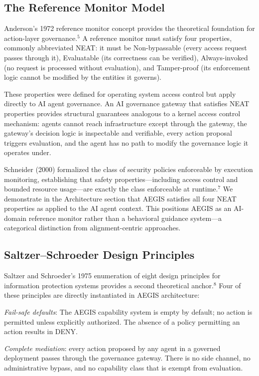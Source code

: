 \documentclass{IEEEcsmag}
\begin{document}
\subsection{The Reference Monitor Model}

Anderson's 1972 reference monitor concept provides the theoretical foundation for action-layer governance.$^{5}$ A reference monitor must satisfy four properties, commonly abbreviated NEAT: it must be Non-bypassable (every access request passes through it), Evaluatable (its correctness can be verified), Always-invoked (no request is processed without evaluation), and Tamper-proof (its enforcement logic cannot be modified by the entities it governs).

These properties were defined for operating system access control but apply directly to AI agent governance. An AI governance gateway that satisfies NEAT properties provides structural guarantees analogous to a kernel access control mechanism: agents cannot reach infrastructure except through the gateway, the gateway's decision logic is inspectable and verifiable, every action proposal triggers evaluation, and the agent has no path to modify the governance logic it operates under.

Schneider (2000) formalized the class of security policies enforceable by execution monitoring, establishing that safety properties---including access control and bounded resource usage---are exactly the class enforceable at runtime.$^{7}$ We demonstrate in the Architecture section that AEGIS satisfies all four NEAT properties as applied to the AI agent context. This positions AEGIS as an AI-domain reference monitor rather than a behavioral guidance system---a categorical distinction from alignment-centric approaches.

\subsection{Saltzer--Schroeder Design Principles}

Saltzer and Schroeder's 1975 enumeration of eight design principles for information protection systems provides a second theoretical anchor.$^{8}$ Four of these principles are directly instantiated in AEGIS architecture:

{\it Fail-safe defaults}: The AEGIS capability system is empty by default; no action is permitted unless explicitly authorized. The absence of a policy permitting an action results in DENY.

{\it Complete mediation}: every action proposed by any agent in a governed deployment passes through the governance gateway. There is no side channel, no administrative bypass, and no capability class that is exempt from evaluation.
\end{document}
